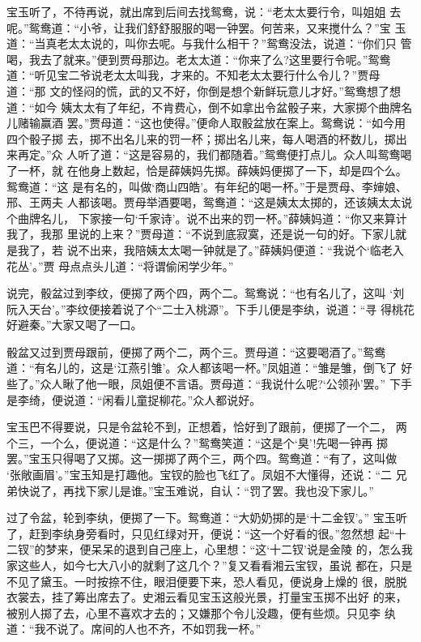 宝玉听了，不待再说，就出席到后间去找鸳鸯，说：“老太太要行令，叫姐姐
去呢。”鸳鸯道：“小爷，让我们舒舒服服的喝一钟罢。何苦来，又来搅什么？”宝
玉道：“当真老太太说的，叫你去呢。与我什么相干？”鸳鸯没法，说道：“你们只
管喝，我去了就来。”便到贾母那边。老太太道：“你来了么?这里要行令呢。”鸳鸯
道：“听见宝二爷说老太太叫我，才来的。不知老太太要行什么令儿？”贾母道：“那
文的怪闷的慌，武的又不好，你倒是想个新鲜玩意儿才好。”鸳鸯想了想道：“如今
姨太太有了年纪，不肯费心，倒不如拿出令盆骰子来，大家掷个曲牌名儿赌输赢酒
罢。”贾母道：“这也使得。”便命人取骰盆放在案上。鸳鸯说：“如今用四个骰子掷
去，掷不出名儿来的罚一杯；掷出名儿来，每人喝酒的杯数儿，掷出来再定。”众
人听了道：“这是容易的，我们都随着。”鸳鸯便打点儿。众人叫鸳鸯喝了一杯，就
在他身上数起，恰是薛姨妈先掷。薛姨妈便掷了一下，却是四个么。鸳鸯道：“这
是有名的，叫做‘商山四皓’。有年纪的喝一杯。”于是贾母、李婶娘、邢、王两夫
人都该喝。贾母举酒要喝，鸳鸯道：“这是姨太太掷的，还该姨太太说个曲牌名儿，
下家接一句‘千家诗’。说不出来的罚一杯。”薛姨妈道：“你又来算计我了，我那
里说的上来？”贾母道：“不说到底寂寞，还是说一句的好。下家儿就是我了，若
说不出来，我陪姨太太喝一钟就是了。”薛姨妈便道：“我说个‘临老入花丛’。”贾
母点点头儿道：“将谓偷闲学少年。”

说完，骰盆过到李纹，便掷了两个四，两个二。鸳鸯说：“也有名儿了，这叫
‘刘阮入天台’。”李纹便接着说了个“二士入桃源”。下手儿便是李纨，说道：“寻
得桃花好避秦。”大家又喝了一口。

骰盆又过到贾母跟前，便掷了两个二，两个三。贾母道：“这要喝酒了。”鸳鸯
道：“有名儿的，这是‘江燕引雏’。众人都该喝一杯。”凤姐道：“雏是雏，倒飞了
好些了。”众人瞅了他一眼，凤姐便不言语。贾母道：“我说什么呢?‘公领孙’罢。”
下手是李绮，便说道：“闲看儿童捉柳花。”众人都说好。

宝玉巴不得要说，只是令盆轮不到，正想着，恰好到了跟前，便掷了一个二，
两个三，一个么，便说道：“这是什么？”鸳鸯笑道：“这是个‘臭’!先喝一钟再
掷罢。”宝玉只得喝了又掷。这一掷掷了两个三，两个四。鸳鸯道：“有了，这叫做
‘张敞画眉’。”宝玉知是打趣他。宝钗的脸也飞红了。凤姐不大懂得，还说：“二
兄弟快说了，再找下家儿是谁。”宝玉难说，自认：“罚了罢。我也没下家儿。”

过了令盆，轮到李纨，便掷了一下。鸳鸯道：“大奶奶掷的是‘十二金钗’。”
宝玉听了，赶到李纨身旁看时，只见红绿对开，便说：“这一个好看的很。”忽然想
起“十二钗”的梦来，便呆呆的退到自己座上，心里想：“这‘十二钗’说是金陵
的，怎么我家这些人，如今七大八小的就剩了这几个？”复又看看湘云宝钗，虽说
都在，只是不见了黛玉。一时按捺不住，眼泪便要下来，恐人看见，便说身上燥的
很，脱脱衣裳去，挂了筹出席去了。史湘云看见宝玉这般光景，打量宝玉掷不出好
的来，被别人掷了去，心里不喜欢才去的；又嫌那个令儿没趣，便有些烦。只见李
纨道：“我不说了。席间的人也不齐，不如罚我一杯。”

